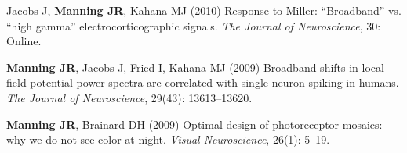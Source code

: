 \documentclass[11pt, a4paper]{article} %
\newcommand{\years}[1]{\marginnote{\footnotesize #1}} %
\begin{document}
\begin{etaremune}
\item Jacobs J, \textbf{Manning JR}, Kahana MJ (2010) Response to Miller: ``Broadband'' vs. ``high gamma'' electrocorticographic signals. \textit{The Journal of Neuroscience}, 30: Online.

\item \textbf{Manning JR}, Jacobs J, Fried I, Kahana MJ (2009) Broadband shifts in local field potential power spectra are correlated with single-neuron spiking in humans. \textit{The Journal of Neuroscience}, 29(43): 13613--13620.

\item \textbf{Manning JR}, Brainard DH (2009) Optimal design of photoreceptor mosaics: why we do not see color at night. \textit{Visual Neuroscience}, 26(1): 5--19.







\end{etaremune}
\end{document}
